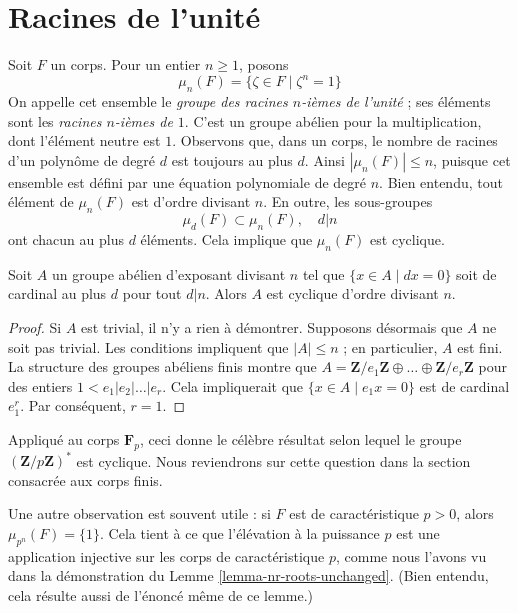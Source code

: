 \section{Racines de l’unité}
\label{section-roots-of-1}

\noindent
Soit $F$ un corps. Pour un entier $n \geq 1$, posons
$$
\mu_n(F) = \{\zeta \in F \mid \zeta^n = 1\}
$$
On appelle cet ensemble le {\it groupe des racines $n$-ièmes de l'unité} ; ses
éléments sont les {\it racines $n$-ièmes de $1$}. C'est un groupe abélien pour la multiplication,
dont l'élément neutre est $1$.
Observons que, dans un corps, le nombre de racines d'un polynôme de degré $d$
est toujours au plus $d$. Ainsi $|\mu_n(F)| \leq n$,
puisque cet ensemble est défini par une équation polynomiale de degré $n$.
Bien entendu, tout élément de $\mu_n(F)$ est d'ordre divisant $n$.
En outre, les sous-groupes
$$
\mu_d(F) \subset \mu_n(F),\quad d | n
$$
ont chacun au plus $d$ éléments. Cela implique que $\mu_n(F)$ est cyclique.

\begin{lemma}
\label{lemma-cyclic}
Soit $A$ un groupe abélien d'exposant divisant $n$ tel que
$\{x \in A \mid dx = 0\}$ soit de cardinal au plus $d$ pour tout $d | n$.
Alors $A$ est cyclique d'ordre divisant $n$.
\end{lemma}

\begin{proof}
Si $A$ est trivial, il n'y a rien à démontrer. Supposons désormais que $A$
ne soit pas trivial.
Les conditions impliquent que $|A| \leq n$ ; en particulier, $A$ est fini.
La structure des groupes abéliens finis montre que
$A = \mathbf{Z}/e_1\mathbf{Z} \oplus \ldots \oplus \mathbf{Z}/e_r\mathbf{Z}$
pour des entiers $1 < e_1 | e_2 | \ldots | e_r$. Cela impliquerait
que $\{x \in A \mid e_1 x = 0\}$ est de cardinal $e_1^r$. Par conséquent,
$r = 1$.
\end{proof}

\noindent
Appliqué au corps $\mathbf{F}_p$, ceci donne le célèbre résultat
selon lequel le groupe $(\mathbf{Z}/p\mathbf{Z})^*$ est cyclique. Nous reviendrons sur
cette question dans la section consacrée aux corps finis.

\medskip\noindent
Une autre observation est souvent utile : si $F$ est de caractéristique
$p > 0$, alors $\mu_{p^n}(F) = \{1\}$. Cela tient à ce que l'élévation
à la puissance $p$ est une application injective sur les corps de caractéristique $p$,
comme nous l'avons vu dans la démonstration du Lemme \ref{lemma-nr-roots-unchanged}.
(Bien entendu, cela résulte aussi de l'énoncé même de ce lemme.)






